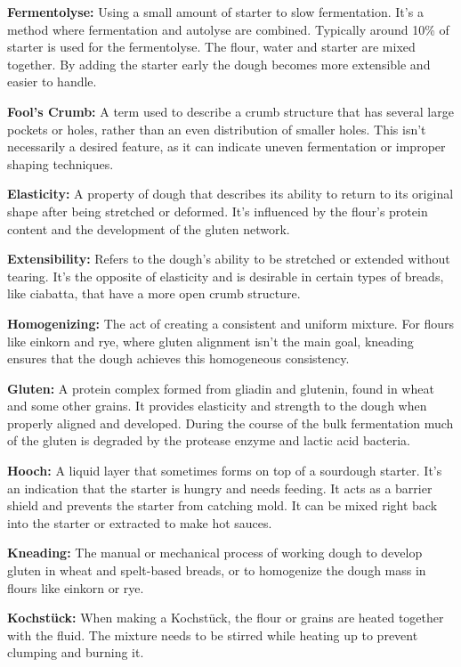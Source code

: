 \textbf{Fermentolyse:} Using a small amount of starter to slow fermentation.
It's a method where fermentation and autolyse are combined. Typically around 10\%
of starter is used for the fermentolyse. The flour, water and starter are mixed
together. By adding the starter early the dough becomes more extensible and easier
to handle.

\textbf{Fool’s Crumb:} A term used to describe a crumb structure that has several
large pockets or holes, rather than an even distribution of smaller holes. This
isn't necessarily a desired feature, as it can indicate uneven fermentation or
improper shaping techniques.

\textbf{Elasticity:} A property of dough that describes its ability to return to
its original shape after being stretched or deformed. It's influenced by the flour's
protein content and the development of the gluten network.

\textbf{Extensibility:} Refers to the dough’s ability to be stretched or extended
without tearing. It's the opposite of elasticity and is desirable in certain types
of breads, like ciabatta, that have a more open crumb structure.

\textbf{Homogenizing:} The act of creating a consistent and uniform mixture. For
flours like einkorn and rye, where gluten alignment isn't the main goal, kneading
ensures that the dough achieves this homogeneous consistency.

\textbf{Gluten:} A protein complex formed from gliadin and glutenin, found in wheat
and some other grains. It provides elasticity and strength to the dough when
properly aligned and developed. During the course of the bulk fermentation much of
the gluten is degraded by the protease enzyme and lactic acid bacteria.

\textbf{Hooch:} A liquid layer that sometimes forms on top of a sourdough starter.
It's an indication that the starter is hungry and needs feeding. It acts as a
barrier shield and prevents the starter from catching mold. It can be mixed right
back into the starter or extracted to make hot sauces.

\textbf{Kneading:} The manual or mechanical process of working dough to develop gluten
in wheat and spelt-based breads, or to homogenize the dough mass in flours like
einkorn or rye.

\textbf{Kochstück:} When making a Kochstück, the flour or grains are heated
together with the fluid. The mixture needs to be stirred while heating up
to prevent clumping and burning it.

